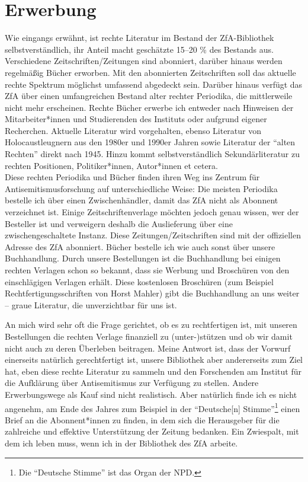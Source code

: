 \documentclass[a4paper,
fontsize=11pt,
oneside,
numbers=noperiodatend,
parskip=half-,
bibliography=totoc,
final
]{scrartcl}
\begin{document}
\hypertarget{erwerbung}{%
\section*{Erwerbung}\label{erwerbung}}

Wie eingangs erwähnt, ist rechte Literatur im Bestand der ZfA-Bibliothek
selbstverständlich, ihr Anteil macht geschätzte 15--20 \% des Bestands
aus. Verschiedene Zeitschriften/Zeitungen sind abonniert, darüber hinaus
werden regelmäßig Bücher erworben. Mit den abonnierten Zeitschriften
soll das aktuelle rechte Spektrum möglichst umfassend abgedeckt sein.
Darüber hinaus verfügt das ZfA über einen umfangreichen Bestand alter
rechter Periodika, die mittlerweile nicht mehr erscheinen. Rechte Bücher
erwerbe ich entweder nach Hinweisen der Mitarbeiter*innen und
Studierenden des Instituts oder aufgrund eigener Recherchen. Aktuelle
Literatur wird vorgehalten, ebenso Literatur von Holocaustleugnern aus
den 1980er und 1990er Jahren sowie Literatur der \enquote{alten Rechten}
direkt nach 1945. Hinzu kommt selbstverständlich Sekundärliteratur zu
rechten Positionen, Politiker*innen, Autor*innen et cetera.\\
Diese rechten Periodika und Bücher finden ihren Weg ins Zentrum für
Antisemitismusforschung auf unterschiedliche Weise: Die meisten
Periodika bestelle ich über einen Zwischenhändler, damit das ZfA nicht
als Abonnent verzeichnet ist. Einige Zeitschriftenverlage möchten jedoch
genau wissen, wer der Besteller ist und verweigern deshalb die
Auslieferung über eine zwischengeschaltete Instanz. Diese
Zeitungen/Zeitschriften sind mit der offiziellen Adresse des ZfA
abonniert. Bücher bestelle ich wie auch sonst über unsere Buchhandlung.
Durch unsere Bestellungen ist die Buchhandlung bei einigen rechten
Verlagen schon so bekannt, dass sie Werbung und Broschüren von den
einschlägigen Verlagen erhält. Diese kostenlosen Broschüren (zum
Beispiel Rechtfertigungsschriften von Horst Mahler) gibt die
Buchhandlung an uns weiter -- graue Literatur, die unverzichtbar für uns
ist.

An mich wird sehr oft die Frage gerichtet, ob es zu rechtfertigen ist,
mit unseren Bestellungen die rechten Verlage finanziell zu
(unter-)stützen und ob wir damit nicht auch zu deren Überleben
beitragen. Meine Antwort ist, dass der Vorwurf einerseits natürlich
gerechtfertigt ist, unsere Bibliothek aber andererseits zum Ziel hat,
eben diese rechte Literatur zu sammeln und den Forschenden am Institut
für die Aufklärung über Antisemitismus zur Verfügung zu stellen. Andere
Erwerbungswege als Kauf sind nicht realistisch. Aber natürlich finde ich
es nicht angenehm, am Ende des Jahres zum Beispiel in der
\enquote{Deutsche{[}n{]} Stimme}\footnote{Die \enquote{Deutsche Stimme}
  ist das Organ der NPD.} einen Brief an die Abonnent*innen zu finden,
in dem sich die Herausgeber für die zahlreiche und effektive
Unterstützung der Zeitung bedanken. Ein Zwiespalt, mit dem ich leben
muss, wenn ich in der Bibliothek des ZfA arbeite.
\end{document}
